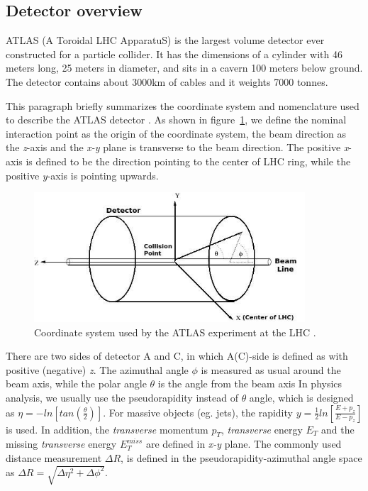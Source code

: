 \subsection{Detector overview}

ATLAS (A Toroidal LHC ApparatuS) is the largest volume detector ever constructed for a particle collider.
It has the dimensions of a cylinder with 46 meters long, 25 meters in diameter, and sits in a cavern 100 meters below ground.
The detector contains about 3000km of cables and it weights 7000 tonnes.

This paragraph briefly summarizes the coordinate system and nomenclature used to describe the ATLAS detector \cite{Collaboration_2008}.
As shown in figure~\ref{fig:coordinate}, we define the nominal interaction point as the origin of the coordinate system, the beam direction as the \textit{z}-axis and the \textit{x-y} plane is transverse to the beam direction.
The positive \textit{x}-axis is defined to be the direction pointing to the center of LHC ring, 
while the positive \textit{y}-axis is pointing upwards.
\begin{figure}[!htb]
  \centering
  \includegraphics[width=0.9\textwidth]{figures/Detector/Coordinate_system_atlas.png}
  \caption{Coordinate system used by the ATLAS experiment at the LHC \cite{Perez:phdthesis}.}
  \label{fig:coordinate}
\end{figure}
There are two sides of detector A and C, in which A(C)-side is defined as with positive (negative) \textit{z}.
The azimuthal angle $\phi$ is measured as usual around the beam axis, while the polar angle $\theta$ is the angle from the beam axis
In physics analysis, we usually use the pseudorapidity instead of $\theta$ angle, which is designed as $\eta = - ln [tan\left( \frac{\theta}{2}\right)]$. 
For massive objects (eg. jets), the rapidity $y = \frac{1}{2} ln[ \frac{E+p_{z}}{E-p_{z}}]$ is used.
In addition, the \textit{transverse} momentum $p_{T}$, \textit{transverse} energy $E_{T}$ and the missing \textit{transverse} energy $E_{T}^{miss}$ are defined in \textit{x-y} plane.
The commonly used distance measurement $\Delta R$, is defined in the pseudorapidity-azimuthal angle space as $\Delta R = \sqrt{ \Delta\eta^{2} + \Delta\phi^{2}}$.

